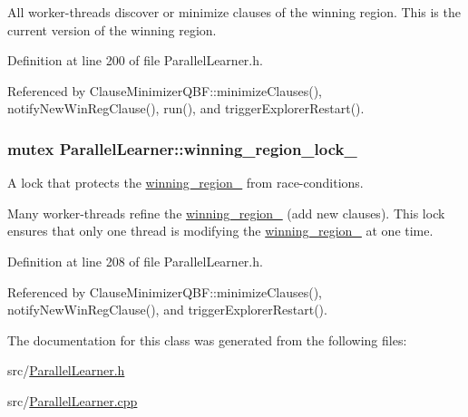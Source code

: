 All worker-\/threads discover or minimize clauses of the winning region. This is the current version of the winning region. 

Definition at line 200 of file Parallel\-Learner.\-h.



Referenced by Clause\-Minimizer\-Q\-B\-F\-::minimize\-Clauses(), notify\-New\-Win\-Reg\-Clause(), run(), and trigger\-Explorer\-Restart().

\hypertarget{classParallelLearner_a196a4500dfd66a4b9110659b4a10dead}{
\subsubsection[{winning\-\_\-region\-\_\-lock\-\_\-}]{\setlength{\rightskip}{0pt plus 5cm}mutex Parallel\-Learner\-::winning\-\_\-region\-\_\-lock\-\_\-}}\label{classParallelLearner_a196a4500dfd66a4b9110659b4a10dead}


A lock that protects the \hyperlink{classParallelLearner_a7c8383543ff98d7a0356a237756dcdd6}{winning\-\_\-region\-\_\-} from race-\/conditions. 

Many worker-\/threads refine the \hyperlink{classParallelLearner_a7c8383543ff98d7a0356a237756dcdd6}{winning\-\_\-region\-\_\-} (add new clauses). This lock ensures that only one thread is modifying the \hyperlink{classParallelLearner_a7c8383543ff98d7a0356a237756dcdd6}{winning\-\_\-region\-\_\-} at one time. 

Definition at line 208 of file Parallel\-Learner.\-h.



Referenced by Clause\-Minimizer\-Q\-B\-F\-::minimize\-Clauses(), notify\-New\-Win\-Reg\-Clause(), and trigger\-Explorer\-Restart().



The documentation for this class was generated from the following files\-:\begin{DoxyCompactItemize}
\item 
src/\hyperlink{ParallelLearner_8h}{Parallel\-Learner.\-h}\item 
src/\hyperlink{ParallelLearner_8cpp}{Parallel\-Learner.\-cpp}\end{DoxyCompactItemize}

